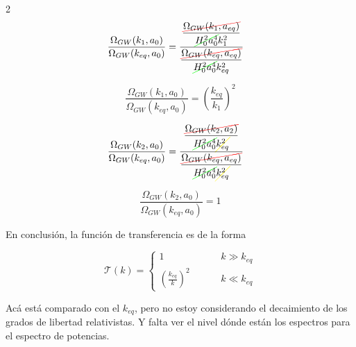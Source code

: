 \begin{multicols}{2}
    \begin{equation*}
        \begin{split}
            \frac{\Omega_{GW} (k_1, a_0)}{\Omega_{GW} (k_{eq}, a_0)} &= \frac{\displaystyle \frac{\colorcancel{red}{\Omega_{GW} (k_{1}, a_{eq})}}{\colorcancel{green}{H_0^2 a_0^4} k^2_{1}}}{\displaystyle \frac{\colorcancel{red}{\Omega_{GW} (k_{eq}, a_{eq})}}{\colorcancel{green}{H_0^2 a_0^4} k^2_{eq}}}
        \end{split}
    \end{equation*}
    
    \begin{equation}
        \frac{\Omega_{GW} (k_1, a_0)}{\Omega_{GW} (k_{eq}, a_0)} = \left( \frac{k_{eq}}{k_1} \right)^2
    \end{equation}

    \columnbreak

    \begin{equation*}
        \begin{split}
            \frac{\Omega_{GW} (k_2, a_0)}{\Omega_{GW} (k_{eq}, a_0)} &= \frac{\displaystyle \frac{\colorcancel{red}{\Omega_{GW} (k_{2}, a_{2})}}{\colorcancel{green}{H_0^2 a_0^4} \colorcancel{yellow}{k^2_{eq}}}}{\displaystyle \frac{\colorcancel{red}{\Omega_{GW} (k_{eq}, a_{eq})}}{\colorcancel{green}{H_0^2 a_0^4} \colorcancel{yellow}{k^2_{eq}}}}
        \end{split}
    \end{equation*}
    
    \begin{equation}
        \frac{\Omega_{GW} (k_2, a_0)}{\Omega_{GW} (k_{eq}, a_0)} = 1
    \end{equation}
\end{multicols}

En conclusión, la función de transferencia es de la forma

\begin{equation}
    \mathcal{T} (k) = \begin{cases}
        1 \hspace{1cm} & k \gg k_{eq}\\
        \displaystyle \left( \frac{k_{eq}}{k} \right)^2 \hspace{1cm} & k \ll k_{eq}
    \end{cases}
\end{equation}

Acá está comparado con el $k_{eq}$, pero no estoy considerando el decaimiento de los grados de libertad relativistas. Y falta ver el nivel dónde están los espectros para el espectro de potencias.


